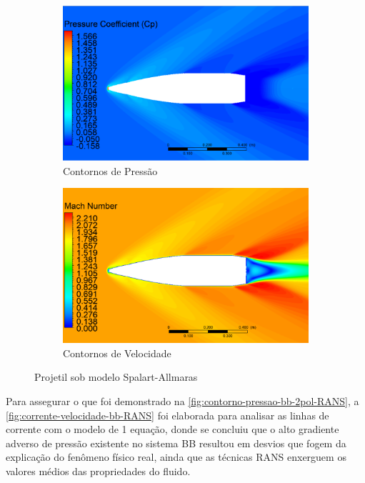 \begin{figure}[!ht]
	\centering
	\begin{subfigure}[b]{0.47\textwidth}
        \centering
        \includegraphics[width=\textwidth]{contorno-pressao-SPALART-2pol.png}
        \caption{Contornos de Pressão}
        \label{fig:contorno-pressao-bb-2pol-RANS}
    \end{subfigure}
    \hfill
    \begin{subfigure}[b]{0.47\textwidth}
        \centering
        \includegraphics[width=\textwidth]{contorno-velocidade-SPALART-2pol.png}
        \caption{Contornos de Velocidade}
        \label{fig:contorno-velocidade-bb-2pol-RANS}
    \end{subfigure}
	\caption{Projetil sob modelo Spalart-Allmaras}
	\label{fig:contornos-pressao-velocidade-RANS}
\end{figure}

Para assegurar o que foi demonstrado na \autoref{fig:contorno-pressao-bb-2pol-RANS}, a \autoref{fig:corrente-velocidade-bb-RANS} foi elaborada para analisar as linhas de corrente com o modelo de 1 equação, donde se concluiu que o alto gradiente adverso de pressão existente no sistema BB resultou em desvios que fogem da explicação do fenômeno físico real, ainda que as técnicas RANS enxerguem os valores médios das propriedades do fluido.


